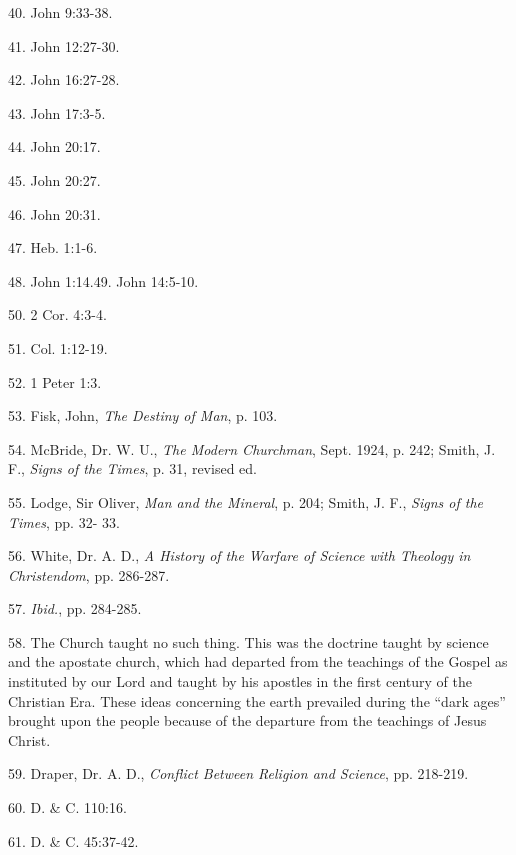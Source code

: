 40. John 9:33-38.

41. John 12:27-30.

42. John 16:27-28.

43. John 17:3-5.

44. John 20:17.

45. John 20:27.

46. John 20:31.

47. Heb. 1:1-6.

48. John 1:14.49. John 14:5-10.

50. 2 Cor. 4:3-4.

51. Col. 1:12-19.

52. 1 Peter 1:3.

53. Fisk, John, \textit{The Destiny of Man}, p. 103.

54. McBride, Dr. W. U., \textit{The Modern Churchman}, Sept. 1924, p. 242; Smith, J. F., \textit{Signs of
the Times}, p. 31, revised ed.

55. Lodge, Sir Oliver, \textit{Man and the Mineral}, p. 204; Smith, J. F., \textit{Signs of the Times}, pp. 32-
33.

56. White, Dr. A. D., \textit{A History of the Warfare of Science with Theology in Christendom}, pp.
286-287.

57. \textit{Ibid.}, pp. 284-285.

58. The Church taught no such thing. This was the doctrine taught by science and the
apostate church, which had departed from the teachings of the Gospel as instituted by our
Lord and taught by his apostles in the first century of the Christian Era. These ideas
concerning the earth prevailed during the ``dark ages'' brought upon the people because of the
departure from the teachings of Jesus Christ.

59. Draper, Dr. A. D., \textit{Conflict Between Religion and Science}, pp. 218-219.

60. D. \& C. 110:16.

61. D. \& C. 45:37-42.

